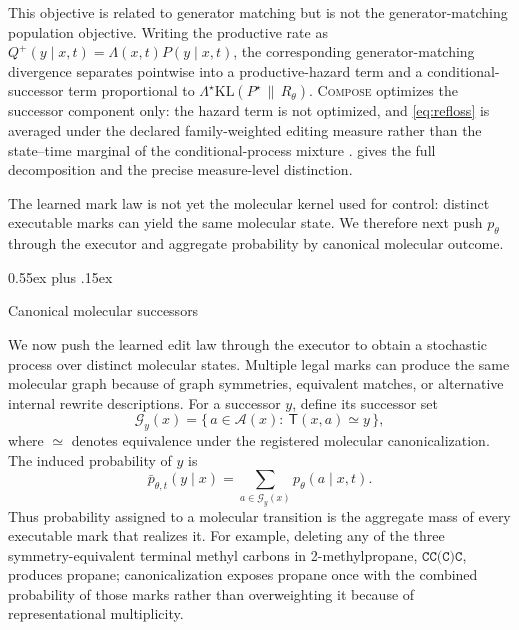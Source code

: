 \documentclass{article}
\makeatletter
\theoremstyle{definition}
\theoremstyle{remark}
\newcommand{\KL}{\mathrm{KL}}
\newcommand{\method}{\textsc{Compose}\xspace}
\def\subsection{\@startsection{subsection}{2}{\z@}{-1.2ex plus -0.4ex minus -.2ex}%
  {0.55ex plus .15ex}{\normalsize\sc\raggedright}}
\newcommand{\A}{\mathcal{A}}
\newcommand{\Gset}{\mathcal{G}}
\newcommand{\T}{\mathsf{T}}
\newcommand{\op}[1]{\texttt{#1}}
\makeatother
\begin{document}
This objective is related to generator matching but is not the generator-matching population objective. Writing the productive rate as $Q^{+}(y\mid x,t)=\Lambda(x,t)P(y\mid x,t)$, the corresponding generator-matching divergence separates pointwise into a productive-hazard term and a conditional-successor term proportional to $\Lambda^{\star}\KL(P^{\star}\,\|\,R_\theta)$. \method{} optimizes the successor component only: the hazard term is not optimized, and \cref{eq:refloss} is averaged under the declared family-weighted editing measure rather than the state--time marginal of the conditional-process mixture \citep{holderrieth2025generator}.  gives the full decomposition and the precise measure-level distinction.

The learned mark law is not yet the molecular kernel used for control: distinct executable marks can yield the same molecular state. We therefore next push $p_\theta$ through the executor and aggregate probability by canonical molecular outcome.

\subsection{Canonical molecular successors}
\label{sec:canonical}

We now push the learned edit law through the executor to obtain a stochastic process over distinct molecular states. Multiple legal marks can produce the same molecular graph because of graph symmetries, equivalent matches, or alternative internal rewrite descriptions. For a successor $y$, define its successor set
\begin{equation}
\Gset_y(x)=\bigl\{\,a\in\A(x):\ \T(x,a)\simeq y\,\bigr\},
\label{eq:sucfiber}
\end{equation}
where $\simeq$ denotes equivalence under the registered molecular canonicalization. The induced probability of $y$ is
\begin{equation}
\bar p_{\theta,t}(y\mid x)=\sum_{a\in\Gset_y(x)}p_\theta(a\mid x,t).
\label{eq:pushforward}
\end{equation}
Thus probability assigned to a molecular transition is the aggregate mass of every executable mark that realizes it. For example, deleting any of the three symmetry-equivalent terminal methyl carbons in 2-methylpropane, $\op{CC(C)C}$, produces propane; canonicalization exposes propane once with the combined probability of those marks rather than overweighting it because of representational multiplicity.
\end{document}

